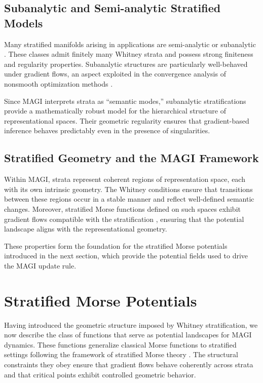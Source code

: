 \documentclass[12pt]{article}
\begin{document}
\subsection*{Subanalytic and Semi-analytic Stratified Models}

Many stratified manifolds arising in applications are semi-analytic or subanalytic \citep{BierstoneMilman1988,Lojasiewicz1965}. These classes admit finitely many Whitney strata and possess strong finiteness and regularity properties. Subanalytic structures are particularly well-behaved under gradient flows, an aspect exploited in the convergence analysis of nonsmooth optimization methods \citep{Bolte2014,HarauxJendoubi2012}.

Since MAGI interprets strata as “semantic modes,” subanalytic stratifications provide a mathematically robust model for the hierarchical structure of representational spaces. Their geometric regularity ensures that gradient-based inference behaves predictably even in the presence of singularities.

\subsection*{Stratified Geometry and the MAGI Framework}

Within MAGI, strata represent coherent regions of representation space, each with its own intrinsic geometry. The Whitney conditions ensure that transitions between these regions occur in a stable manner and reflect well-defined semantic changes. Moreover, stratified Morse functions defined on such spaces exhibit gradient flows compatible with the stratification \citep{GoreskyMacPherson1988}, ensuring that the potential landscape aligns with the representational geometry.

These properties form the foundation for the stratified Morse potentials introduced in the next section, which provide the potential fields used to drive the MAGI update rule.
\section{Stratified Morse Potentials}

Having introduced the geometric structure imposed by Whitney stratification, we now describe the class of functions that serve as potential landscapes for MAGI dynamics. These functions generalize classical Morse functions \citep{Milnor1963} to stratified settings following the framework of stratified Morse theory \citep{GoreskyMacPherson1988}. The structural constraints they obey ensure that gradient flows behave coherently across strata and that critical points exhibit controlled geometric behavior.
\end{document}

